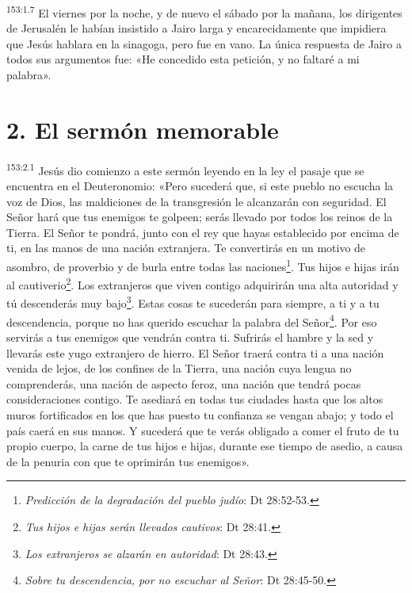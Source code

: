 \par
\textsuperscript{153:1.7} El viernes por la noche, y de nuevo el sábado por la mañana, los dirigentes de Jerusalén le habían insistido a Jairo larga y encarecidamente que impidiera que Jesús hablara en la sinagoga, pero fue en vano. La única respuesta de Jairo a todos sus argumentos fue: «He concedido esta petición, y no faltaré a mi palabra».

\section*{2. El sermón memorable}
\par
\textsuperscript{153:2.1} Jesús dio comienzo a este sermón leyendo en la ley el pasaje que se encuentra en el Deuteronomio: «Pero sucederá que, si este pueblo no escucha la voz de Dios, las maldiciones de la transgresión le alcanzarán con seguridad. El Señor hará que tus enemigos te golpeen; serás llevado por todos los reinos de la Tierra. El Señor te pondrá, junto con el rey que hayas establecido por encima de ti, en las manos de una nación extranjera. Te convertirás en un motivo de asombro, de proverbio y de burla entre todas las naciones\footnote{\textit{Predicción de la degradación del pueblo judío}: Dt 28:52-53.}. Tus hijos e hijas irán al cautiverio\footnote{\textit{Tus hijos e hijas serán llevados cautivos}: Dt 28:41.}. Los extranjeros que viven contigo adquirirán una alta autoridad y tú descenderás muy bajo\footnote{\textit{Los extranjeros se alzarán en autoridad}: Dt 28:43.}. Estas cosas te sucederán para siempre, a ti y a tu descendencia, porque no has querido escuchar la palabra del Señor\footnote{\textit{Sobre tu descendencia, por no escuchar al Señor}: Dt 28:45-50.}. Por eso servirás a tus enemigos que vendrán contra ti. Sufrirás el hambre y la sed y llevarás este yugo extranjero de hierro. El Señor traerá contra ti a una nación venida de lejos, de los confines de la Tierra, una nación cuya lengua no comprenderás, una nación de aspecto feroz, una nación que tendrá pocas consideraciones contigo. Te asediará en todas tus ciudades hasta que los altos muros fortificados en los que has puesto tu confianza se vengan abajo; y todo el país caerá en sus manos. Y sucederá que te verás obligado a comer el fruto de tu propio cuerpo, la carne de tus hijos e hijas, durante ese tiempo de asedio, a causa de la penuria con que te oprimirán tus enemigos».

